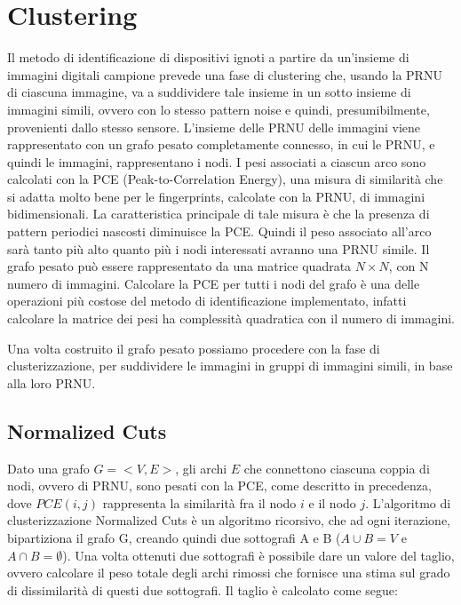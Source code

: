 \section{Clustering}

Il metodo di identificazione di dispositivi ignoti a partire da un'insieme di immagini digitali campione prevede una fase di clustering che, usando la PRNU di ciascuna immagine, va a suddividere tale insieme in un sotto insieme di immagini simili, ovvero con lo stesso pattern noise e quindi, presumibilmente, provenienti dallo stesso sensore.
L'insieme delle PRNU delle immagini viene rappresentato con un grafo pesato completamente connesso, in cui le PRNU, e quindi le immagini, rappresentano i nodi. I pesi associati a ciascun arco sono calcolati con la PCE (Peak-to-Correlation Energy), una misura di similarità che si adatta molto bene per le fingerprints, calcolate con la PRNU, di immagini bidimensionali. La caratteristica principale di tale misura è che la presenza di pattern periodici nascosti diminuisce la PCE. Quindi il peso associato all'arco sarà tanto più alto quanto più i nodi interessati avranno una PRNU simile. Il grafo pesato può essere rappresentato da una matrice quadrata $N\times N$, con N numero di immagini.
Calcolare la PCE per tutti i nodi del grafo è una delle operazioni più costose del metodo di identificazione implementato, infatti calcolare la matrice dei pesi ha complessità quadratica con il numero di immagini.

Una volta costruito il grafo pesato possiamo procedere con la fase di clusterizzazione, per suddividere le immagini in gruppi di immagini simili, in base alla loro PRNU.


\subsection{Normalized Cuts}

Dato una grafo $ G = <V, E> $, gli archi $E$ che connettono ciascuna coppia di nodi, ovvero di PRNU, sono pesati con la PCE, come descritto in precedenza, dove $PCE(i, j)$ rappresenta la similarità fra il nodo $i$ e il nodo $j$.
L'algoritmo di clusterizzazione Normalized Cuts è un algoritmo ricorsivo, che ad ogni iterazione, bipartiziona il grafo G, creando quindi due sottografi A e B ($A\cup B = V$ e $A\cap B = \emptyset$). Una volta ottenuti due sottografi è possibile dare un valore del taglio, ovvero calcolare il peso totale  degli archi rimossi che fornisce una stima sul grado di dissimilarità di questi due sottografi. Il taglio è calcolato come segue: 

